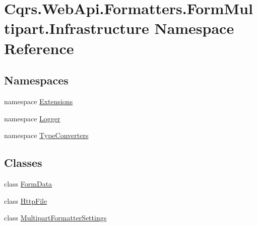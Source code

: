 \hypertarget{namespaceCqrs_1_1WebApi_1_1Formatters_1_1FormMultipart_1_1Infrastructure}{}\section{Cqrs.\+Web\+Api.\+Formatters.\+Form\+Multipart.\+Infrastructure Namespace Reference}
\label{namespaceCqrs_1_1WebApi_1_1Formatters_1_1FormMultipart_1_1Infrastructure}
\subsection*{Namespaces}
\begin{DoxyCompactItemize}
\item 
namespace \hyperlink{namespaceCqrs_1_1WebApi_1_1Formatters_1_1FormMultipart_1_1Infrastructure_1_1Extensions}{Extensions}
\item 
namespace \hyperlink{namespaceCqrs_1_1WebApi_1_1Formatters_1_1FormMultipart_1_1Infrastructure_1_1Logger}{Logger}
\item 
namespace \hyperlink{namespaceCqrs_1_1WebApi_1_1Formatters_1_1FormMultipart_1_1Infrastructure_1_1TypeConverters}{Type\+Converters}
\end{DoxyCompactItemize}
\subsection*{Classes}
\begin{DoxyCompactItemize}
\item 
class \hyperlink{classCqrs_1_1WebApi_1_1Formatters_1_1FormMultipart_1_1Infrastructure_1_1FormData}{Form\+Data}
\item 
class \hyperlink{classCqrs_1_1WebApi_1_1Formatters_1_1FormMultipart_1_1Infrastructure_1_1HttpFile}{Http\+File}
\item 
class \hyperlink{classCqrs_1_1WebApi_1_1Formatters_1_1FormMultipart_1_1Infrastructure_1_1MultipartFormatterSettings}{Multipart\+Formatter\+Settings}
\end{DoxyCompactItemize}
